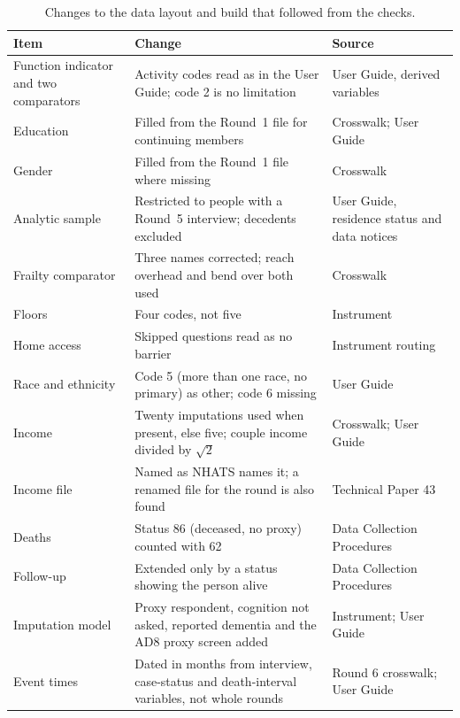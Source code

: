 \begin{table}[htbp]
\centering
\caption{Changes to the data layout and build that followed from the checks.}
\label{tab:G_changes}
\footnotesize
\renewcommand{\arraystretch}{1.15}
\begin{tabular}{p{4.2cm} p{6.4cm} p{3.4cm}}
\toprule
\textbf{Item} & \textbf{Change} & \textbf{Source} \\
\midrule
Function indicator and two comparators & Activity codes read as in the User Guide; code 2 is no limitation & User Guide, derived variables \\
Education & Filled from the Round~1 file for continuing members & Crosswalk; User Guide \\
Gender & Filled from the Round~1 file where missing & Crosswalk \\
Analytic sample & Restricted to people with a Round~5 interview; decedents excluded & User Guide, residence status and data notices \\
Frailty comparator & Three names corrected; reach overhead and bend over both used & Crosswalk \\
Floors & Four codes, not five & Instrument \\
Home access & Skipped questions read as no barrier & Instrument routing \\
Race and ethnicity & Code 5 (more than one race, no primary) as other; code 6 missing & User Guide \\
Income & Twenty imputations used when present, else five; couple income divided by $\sqrt{2}$ & Crosswalk; User Guide \\
Income file & Named as NHATS names it; a renamed file for the round is also found & Technical Paper 43 \\
Deaths & Status 86 (deceased, no proxy) counted with 62 & Data Collection Procedures \\
Follow-up & Extended only by a status showing the person alive & Data Collection Procedures \\
Imputation model & Proxy respondent, cognition not asked, reported dementia and the AD8 proxy screen added & Instrument; User Guide \\
Event times & Dated in months from interview, case-status and death-interval variables, not whole rounds & Round 6 crosswalk; User Guide \\
\bottomrule
\end{tabular}
\end{table}

